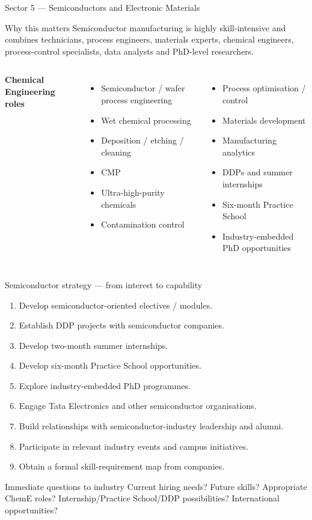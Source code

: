 \documentclass[aspectratio=169,11pt]{beamer}
\begin{document}
\begin{frame}{Sector 5 — Semiconductors and Electronic Materials}
\begin{block}{Why this matters}
Semiconductor manufacturing is highly skill-intensive and combines technicians, process engineers, materials experts, chemical engineers, process-control specialists, data analysts and PhD-level researchers.
\end{block}
\begin{columns}[T]
\textbf{Chemical Engineering roles}
\begin{itemize}
\item Semiconductor / wafer process engineering
\item Wet chemical processing
\item Deposition / etching / cleaning
\item CMP
\item Ultra-high-purity chemicals
\item Contamination control
\end{itemize}
\begin{itemize}
\item Process optimisation / control
\item Materials development
\item Manufacturing analytics
\item DDPs and summer internships
\item Six-month Practice School
\item Industry-embedded PhD opportunities
\end{itemize}
\end{columns}
\end{frame}

\begin{frame}{Semiconductor strategy — from interest to capability}
\begin{enumerate}
\item Develop semiconductor-oriented electives / modules.
\item Establish DDP projects with semiconductor companies.
\item Develop two-month summer internships.
\item Develop six-month Practice School opportunities.
\item Explore industry-embedded PhD programmes.
\item Engage Tata Electronics and other semiconductor organisations.
\item Build relationships with semiconductor-industry leadership and alumni.
\item Participate in relevant industry events and campus initiatives.
\item Obtain a formal skill-requirement map from companies.
\end{enumerate}
\begin{block}{Immediate questions to industry}
Current hiring needs? Future skills? Appropriate ChemE roles? Internship/Practice School/DDP possibilities? International opportunities?
\end{block}
\end{frame}
\end{document}
